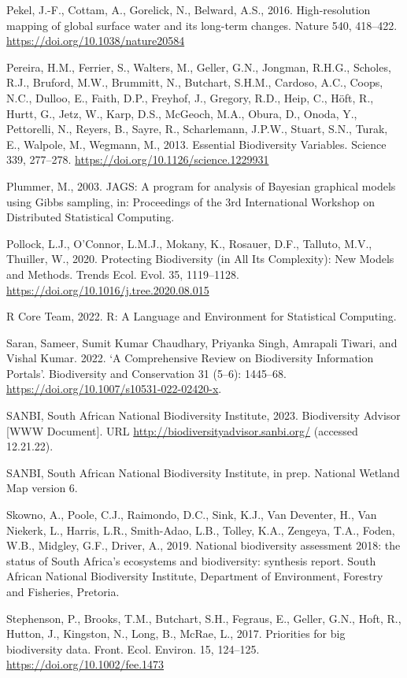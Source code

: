 \documentclass[utf8]{frontiersSCNS}
\begin{document}
Pekel, J.-F., Cottam, A., Gorelick, N., Belward, A.S., 2016.
High-resolution mapping of global surface water and its long-term
changes. Nature 540, 418--422. \url{https://doi.org/10.1038/nature20584}

Pereira, H.M., Ferrier, S., Walters, M., Geller, G.N., Jongman, R.H.G.,
Scholes, R.J., Bruford, M.W., Brummitt, N., Butchart, S.H.M., Cardoso,
A.C., Coops, N.C., Dulloo, E., Faith, D.P., Freyhof, J., Gregory, R.D.,
Heip, C., Höft, R., Hurtt, G., Jetz, W., Karp, D.S., McGeoch, M.A.,
Obura, D., Onoda, Y., Pettorelli, N., Reyers, B., Sayre, R.,
Scharlemann, J.P.W., Stuart, S.N., Turak, E., Walpole, M., Wegmann, M.,
2013. Essential Biodiversity Variables. Science 339, 277--278.
\url{https://doi.org/10.1126/science.1229931}

Plummer, M., 2003. JAGS: A program for analysis of Bayesian graphical
models using Gibbs sampling, in: Proceedings of the 3rd International
Workshop on Distributed Statistical Computing.

Pollock, L.J., O'Connor, L.M.J., Mokany, K., Rosauer, D.F., Talluto,
M.V., Thuiller, W., 2020. Protecting Biodiversity (in All Its
Complexity): New Models and Methods. Trends Ecol. Evol. 35, 1119--1128.
\url{https://doi.org/10.1016/j.tree.2020.08.015}

R Core Team, 2022. R: A Language and Environment for Statistical
Computing.

Saran, Sameer, Sumit Kumar Chaudhary, Priyanka Singh, Amrapali Tiwari,
and Vishal Kumar. 2022. `A Comprehensive Review on Biodiversity
Information Portals'. Biodiversity and Conservation 31 (5--6): 1445--68.
\url{https://doi.org/10.1007/s10531-022-02420-x}.

SANBI, South African National Biodiversity Institute, 2023. Biodiversity
Advisor {[}WWW Document{]}. URL
\url{http://biodiversityadvisor.sanbi.org/} (accessed 12.21.22).

SANBI, South African National Biodiversity Institute, in prep. National
Wetland Map version 6.

Skowno, A., Poole, C.J., Raimondo, D.C., Sink, K.J., Van Deventer, H.,
Van Niekerk, L., Harris, L.R., Smith-Adao, L.B., Tolley, K.A., Zengeya,
T.A., Foden, W.B., Midgley, G.F., Driver, A., 2019. National
biodiversity assessment 2018: the status of South Africa's ecosystems
and biodiversity: synthesis report. South African National Biodiversity
Institute, Department of Environment, Forestry and Fisheries, Pretoria.

Stephenson, P., Brooks, T.M., Butchart, S.H., Fegraus, E., Geller, G.N.,
Hoft, R., Hutton, J., Kingston, N., Long, B., McRae, L., 2017.
Priorities for big biodiversity data. Front. Ecol. Environ. 15,
124--125. \url{https://doi.org/10.1002/fee.1473}
\end{document}
